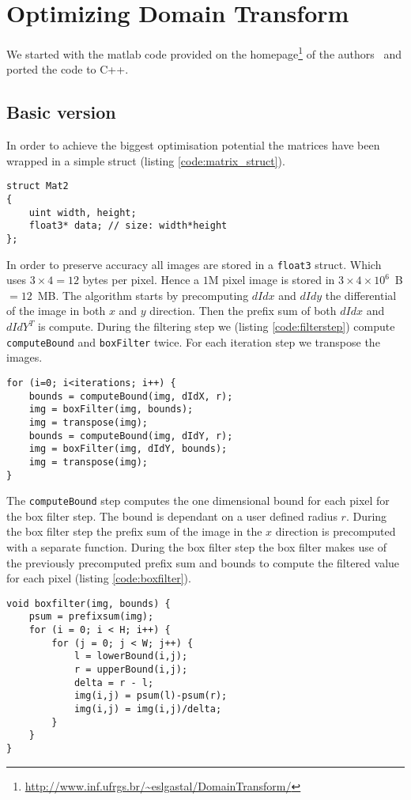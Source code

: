\section{Optimizing Domain Transform}
We started with the matlab code provided on the homepage\footnote{\url{http://www.inf.ufrgs.br/~eslgastal/DomainTransform/}} of the authors~\cite{GastalOliveira2011DomainTransform} and ported the code to C++. 
\subsection{Basic version}
In order to achieve the biggest optimisation potential the matrices have been wrapped in a simple struct (listing \ref{code:matrix_struct}).
\begin{lstlisting}[caption=Matrix struct,label=code:matrix_struct]
struct Mat2
{
    uint width, height;
    float3* data; // size: width*height
};
\end{lstlisting}
In order to preserve accuracy all images are stored in a \lstinline{float3} struct. Which uses $3\times 4 = 12$ bytes per pixel. Hence a $1$M pixel image is stored in $3\times 4\times 10^6$\ B $=12$\ MB.
The algorithm starts by precomputing $dIdx$ and $dIdy$ the differential of the image in both $x$ and $y$ direction. Then the prefix sum of both $dIdx$ and $dIdY^T$ is compute. 
During the filtering step we (listing \ref{code:filterstep}) compute \lstinline{computeBound} and \lstinline{boxFilter} twice. For each iteration step we transpose the images.
\begin{lstlisting}[caption=Filterstep,label=code:filterstep]
for (i=0; i<iterations; i++) {
    bounds = computeBound(img, dIdX, r);
    img = boxFilter(img, bounds);
    img = transpose(img);
    bounds = computeBound(img, dIdY, r);
    img = boxFilter(img, dIdY, bounds);
    img = transpose(img);
}
\end{lstlisting}
The \lstinline{computeBound} step computes the one dimensional bound for each pixel for the box filter step. The bound is dependant on a user defined radius $r$. 
During the box filter step the prefix sum of the image in the $x$ direction is precomputed with a separate function. During the box filter step the box filter makes use of the previously precomputed prefix sum and bounds to compute the filtered value for each pixel (listing \ref{code:boxfilter}).
\begin{lstlisting}[caption=Boxfilter step, label=code:boxfilter]
void boxfilter(img, bounds) {
    psum = prefixsum(img);
    for (i = 0; i < H; i++) {
        for (j = 0; j < W; j++) {
            l = lowerBound(i,j);
            r = upperBound(i,j);
            delta = r - l;
            img(i,j) = psum(l)-psum(r);
            img(i,j) = img(i,j)/delta;
        }
    }
}
\end{lstlisting}



